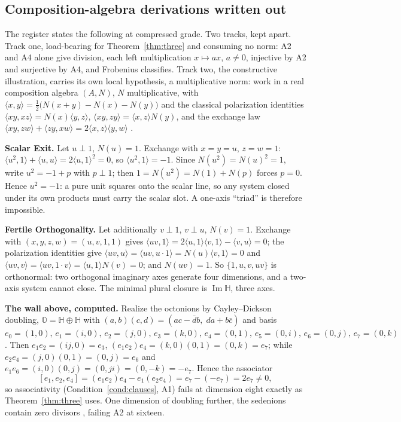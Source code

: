 \documentclass[twocolumn,10pt]{article}
\theoremstyle{plain}
\theoremstyle{definition}
\newcommand{\Hq}{\mathbb{H}}
\begin{document}
\subsection{Composition-algebra derivations written out}
The register states the following at compressed grade. Two tracks, kept apart. Track one, load-bearing for Theorem~\ref{thm:three} and consuming no norm: A2 and A4 alone give division, each left multiplication $x\mapsto ax$, $a\ne0$, injective by A2 and surjective by A4, and Frobenius classifies. Track two, the constructive illustration, carries its own local hypothesis, a multiplicative norm: work in a real composition algebra $(A,N)$, $N$ multiplicative, with $\langle x,y\rangle=\tfrac12\bigl(N(x{+}y)-N(x)-N(y)\bigr)$ and the classical polarization identities $\langle xy,xz\rangle=N(x)\langle y,z\rangle$, $\langle xy,zy\rangle=\langle x,z\rangle N(y)$, and the exchange law $\langle xy,zw\rangle+\langle zy,xw\rangle=2\langle x,z\rangle\langle y,w\rangle$ \cite{Schafer1966}.

\textbf{Scalar Exit.} Let $u\perp 1$, $N(u)=1$. Exchange with $x=y=u$, $z=w=1$: $\langle u^2,1\rangle+\langle u,u\rangle=2\langle u,1\rangle^2=0$, so $\langle u^2,1\rangle=-1$. Since $N(u^2)=N(u)^2=1$, write $u^2=-1+p$ with $p\perp1$; then $1=N(u^2)=N(1)+N(p)$ forces $p=0$. Hence $u^2=-1$: a pure unit squares onto the scalar line, so any system closed under its own products must carry the scalar slot. A one-axis ``triad'' is therefore impossible.

\textbf{Fertile Orthogonality.} Let additionally $v\perp1$, $v\perp u$, $N(v)=1$. Exchange with $(x,y,z,w)=(u,v,1,1)$ gives $\langle uv,1\rangle=2\langle u,1\rangle\langle v,1\rangle-\langle v,u\rangle=0$; the polarization identities give $\langle uv,u\rangle=\langle u v,u\cdot1\rangle=N(u)\langle v,1\rangle=0$ and $\langle uv,v\rangle=\langle uv,1\cdot v\rangle=\langle u,1\rangle N(v)=0$; and $N(uv)=1$. So $\{1,u,v,uv\}$ is orthonormal: two orthogonal imaginary axes generate four dimensions, and a two-axis system cannot close. The minimal plural closure is $\operatorname{Im}\Hq$, three axes.

\textbf{The wall above, computed.} Realize the octonions by Cayley--Dickson doubling, $\mathbb O=\Hq\oplus\Hq$ with $(a,b)(c,d)=(ac-\bar d b,\; da+b\bar c)$ and basis $e_0=(1,0),\,e_1=(i,0),\,e_2=(j,0),\,e_3=(k,0),\,e_4=(0,1),\,e_5=(0,i),\,e_6=(0,j),\,e_7=(0,k)$. Then $e_1e_2=(ij,0)=e_3$, $(e_1e_2)e_4=(k,0)(0,1)=(0,k)=e_7$; while $e_2e_4=(j,0)(0,1)=(0,j)=e_6$ and $e_1e_6=(i,0)(0,j)=(0,ji)=(0,-k)=-e_7$. Hence the associator
\[
[e_1,e_2,e_4]=(e_1e_2)e_4-e_1(e_2e_4)=e_7-(-e_7)=2e_7\neq0,
\]
so associativity (Condition~\ref{cond:clauses}, A1) fails at dimension eight exactly as Theorem~\ref{thm:three} uses. One dimension of doubling further, the sedenions contain zero divisors \cite{Schafer1966}, failing A2 at sixteen.
\end{document}
